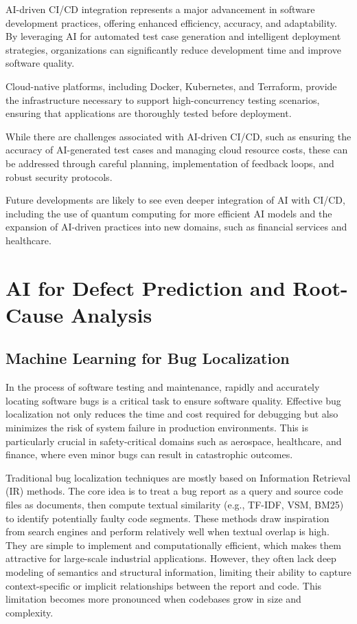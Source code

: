 \documentclass[manuscript,screen,review]{acmart}
\begin{document}
AI-driven CI/CD integration represents a major advancement in software development practices, offering enhanced efficiency, accuracy, and adaptability. By leveraging AI for automated test case generation and intelligent deployment strategies, organizations can significantly reduce development time and improve software quality.

Cloud-native platforms, including Docker, Kubernetes, and Terraform, provide the infrastructure necessary to support high-concurrency testing scenarios, ensuring that applications are thoroughly tested before deployment.

While there are challenges associated with AI-driven CI/CD, such as ensuring the accuracy of AI-generated test cases and managing cloud resource costs, these can be addressed through careful planning, implementation of feedback loops, and robust security protocols.

Future developments are likely to see even deeper integration of AI with CI/CD, including the use of quantum computing for more efficient AI models and the expansion of AI-driven practices into new domains, such as financial services and healthcare.

\section{AI for Defect Prediction and Root-Cause Analysis}

\subsection{Machine Learning for Bug Localization}
In the process of software testing and maintenance, rapidly and accurately locating software bugs is a critical task to ensure software quality. Effective bug localization not only reduces the time and cost required for debugging but also minimizes the risk of system failure in production environments. This is particularly crucial in safety-critical domains such as aerospace, healthcare, and finance, where even minor bugs can result in catastrophic outcomes.

Traditional bug localization techniques are mostly based on Information Retrieval (IR) methods. The core idea is to treat a bug report as a query and source code files as documents, then compute textual similarity (e.g., TF-IDF, VSM, BM25) to identify potentially faulty code segments. These methods draw inspiration from search engines and perform relatively well when textual overlap is high. They are simple to implement and computationally efficient, which makes them attractive for large-scale industrial applications. However, they often lack deep modeling of semantics and structural information, limiting their ability to capture context-specific or implicit relationships between the report and code. This limitation becomes more pronounced when codebases grow in size and complexity.
\end{document}
